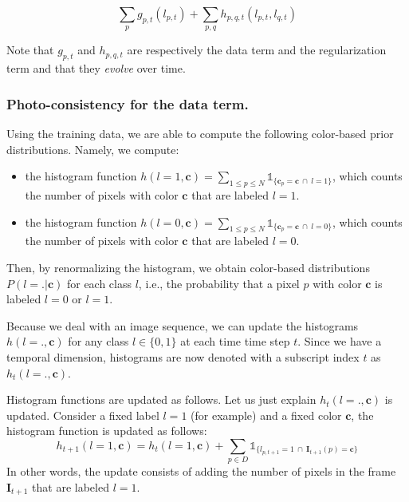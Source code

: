 \documentclass[a4paper,twoside,10pt]{article}
\begin{document}
\begin{equation}
\sum_p g_{p,t}(l_{p,t}) + \sum_{p,q} h_{p,q,t} (l_{p,t}, l_{q,t})
\end{equation}

Note that $g_{p,t}$ and $h_{p,q,t}$ are respectively the data term and the regularization term and that they \emph{evolve} over time.


\subsubsection{Photo-consistency for the data term.}
Using the training data, we are able to compute the following color-based prior distributions. Namely, we compute:
\begin{itemize}
\item the histogram function $h(l = 1, \mathbf{c}) = \displaystyle\sum_{1 \leq p \leq N} \mathds{1}_{\{\mathbf{c}_p = \mathbf{c}\ \cap \ l = 1\}}$, which counts the number of pixels with color $\mathbf{c}$ that are labeled $l=1$.
\item the histogram function $h(l = 0, \mathbf{c}) = \displaystyle\sum_{1 \leq p \leq N} \mathds{1}_{\{\mathbf{c}_p = \mathbf{c}\ \cap\ l = 0\}}$, which counts the number of pixels with color $\mathbf{c}$ that are labeled $l=0$.
\end{itemize}
Then, by renormalizing the histogram, we obtain color-based distributions\\ $P(l = . | \mathbf{c})$ for each class $l$, i.e., the probability that a pixel $p$ with color $\mathbf{c}$ is labeled $l=0$ or $l=1$.

Because we deal with an image sequence, we can update the histograms $h(l = ., \mathbf{c})$ for any class $l \in \{0, 1\}$ at each time time step $t$. Since we have a temporal dimension, histograms are now denoted with a subscript index $t$ as $h_t(l = ., \mathbf{c})$.

Histogram functions are updated as follows. Let us just explain $h_{t}(l = ., \mathbf{c})$ is updated. Consider a fixed label $l=1$ (for example) and a fixed color $\mathbf{c}$, the histogram function is updated as follows:
\begin{equation}
h_{t+1}(l = 1, \mathbf{c}) = h_t(l=1, \mathbf{c}) + \sum_{p \in D} \mathds{1}_{\{l_{p,t+1} = 1\ \cap\ \mathbf{I}_{t+1}(p) = \mathbf{c}\}}
\end{equation}
In other words, the update consists of adding the number of pixels in the frame $\mathbf{I}_{t+1}$ that are labeled $l=1$.
\end{document}

